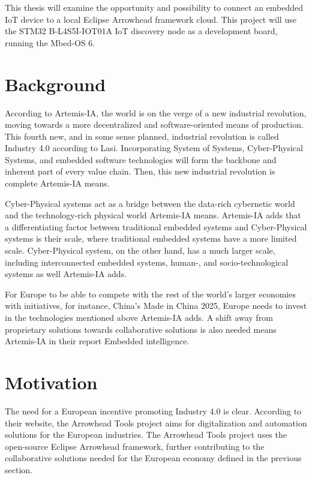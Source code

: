 This thesis will examine the opportunity and possibility to connect an embedded IoT device to a local Eclipse Arrowhead framework cloud.
This project will use the STM32 B-L4S5I-IOT01A IoT discovery node as a development board, running the Mbed-OS 6. 
\section{Background}
According to Artemis-IA, the world is on the verge of a new industrial revolution, moving towards a more decentralized and software-oriented means of production.\cite{Artemis2021}
This fourth new, and in some sense planned, industrial revolution is called Industry 4.0 according to  Lasi.\cite{Lasi2014} 
Incorporating System of Systems, Cyber-Physical Systems, and embedded software technologies will form the backbone and inherent part of every value chain. Then, this new industrial revolution is complete Artemis-IA means.\cite{Artemis2021}

Cyber-Physical systems act as a bridge between the data-rich cybernetic world and the technology-rich physical world Artemis-IA means.
Artemis-IA adds that a differentiating factor between traditional embedded systems and Cyber-Physical systems is their scale, where traditional embedded systems have a more limited scale.
Cyber-Physical system, on the other hand, has a much larger scale, including interconnected embedded systems, human-, and socio-technological systems as well Artemis-IA adds.\cite{Artemis2021}

For Europe to be able to compete with the rest of the world's larger economies with initiatives, for instance, China's Made in China 2025, Europe needs to invest in the technologies mentioned above Artemis-IA adds.
A shift away from proprietary solutions towards collaborative solutions is also needed means Artemis-IA in their report Embedded intelligence.\cite{Artemis2021} 
\section{Motivation}
The need for a European incentive promoting Industry 4.0 is clear. 
According to their website, the Arrowhead Tools project aims for digitalization and automation solutions for the European industries.\cite{AT2021}
The Arrowhead Tools project uses the open-source Eclipse Arrowhead framework, further contributing to the collaborative solutions needed for the European economy defined in the previous section.

